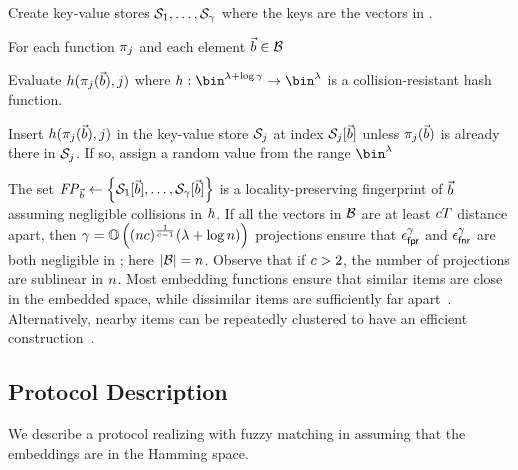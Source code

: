 \enumListStart
\item Create \numProjections key-value stores $\projBuckets[1], \dots, \projBuckets[\numProjections]$ where the keys are the vectors in \blocklist.
\item For each function $\projFn[\projIdx]$ and each element $\blocklistVec \in \blocklist$
\enumListStart
\item Evaluate  $\hashFn(\projFn[\projIdx](\blocklistVec), \projIdx)$ where $\hashFn: \bin^{\secParam + \log \numProjections} \rightarrow \bin^{\secParam}$ is a collision-resistant hash function. 
\item Insert $\hashFn(\projFn[\projIdx](\blocklistVec), \projIdx)$  in the key-value store $\projBuckets[\projIdx]$ at index $\projBuckets[\projIdx][\blocklistVec]$ unless $\projFn[\projIdx](\blocklistVec)$ is already there in $\projBuckets[\projIdx]$. If so, assign a random value from the range $\bin^{\secParam}$
\enumListEnd
\enumListEnd

The set $\fingerprint{\blocklistVec} \assign \setDefn{\projBuckets[1][\blocklistVec], \dots, \projBuckets[\numProjections][\blocklistVec]}$ is a locality-preserving 
fingerprint of $\blocklistVec$ assuming negligible collisions in $\hashFn$. If all the vectors in $\blocklist$ are at least $c 
T$ distance apart, then $\gamma = \mathbb{O}\left((n 
c)^{\frac{1}{c - 1}} (\lambda + \log n)\right)$ projections ensure that 
$\epsilon_\mathsf{fpr}^\gamma$ and $\epsilon_\mathsf{fnr}^\gamma$ are both negligible in \secParam; here $\setSize{\blocklist} = \blocklistSize$. Observe that if $c > 2$, the number of projections are sublinear in 
$n$. Most embedding functions ensure that similar 
items are close in the embedded space, while dissimilar items are sufficiently far apart~\cite{kulshrestha2021identifying, mckeown2023hamming}. Alternatively, nearby items can be repeatedly 
clustered to have an efficient construction~\cite{chongchitmate2024approximate}.


\subsection{Protocol Description}
%
We describe a protocol realizing \contentModFunc with fuzzy matching in  assuming that the embeddings are in the Hamming space. 


